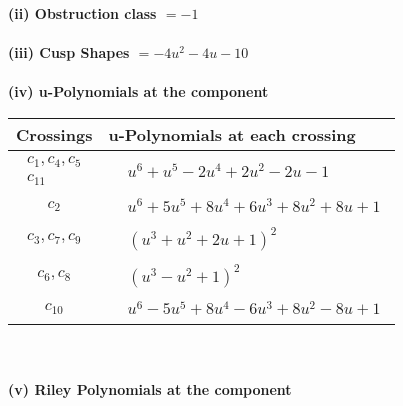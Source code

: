 \documentclass[1p]{elsarticle_modified}
\theoremstyle{definition}
\begin{document}
\flushleft \textbf{(ii) Obstruction class $= -1$}\\~\\
\flushleft \textbf{(iii) Cusp Shapes $= -4 u^2-4 u-10$}\\~\\
\newpage\renewcommand{\arraystretch}{1}
\flushleft \textbf{(iv) u-Polynomials at the component}\newline \\
\begin{tabular}{m{50pt}|m{274pt}}
Crossings & \hspace{64pt}u-Polynomials at each crossing \\
\hline $$\begin{aligned}c_{1},c_{4},c_{5}\\c_{11}\end{aligned}$$&$\begin{aligned}
&u^6+u^5-2 u^4+2 u^2-2 u-1
\end{aligned}$\\
\hline $$\begin{aligned}c_{2}\end{aligned}$$&$\begin{aligned}
&u^6+5 u^5+8 u^4+6 u^3+8 u^2+8 u+1
\end{aligned}$\\
\hline $$\begin{aligned}c_{3},c_{7},c_{9}\end{aligned}$$&$\begin{aligned}
&(u^3+u^2+2 u+1)^2
\end{aligned}$\\
\hline $$\begin{aligned}c_{6},c_{8}\end{aligned}$$&$\begin{aligned}
&(u^3- u^2+1)^2
\end{aligned}$\\
\hline $$\begin{aligned}c_{10}\end{aligned}$$&$\begin{aligned}
&u^6-5 u^5+8 u^4-6 u^3+8 u^2-8 u+1
\end{aligned}$\\
\hline
\end{tabular}\\~\\
\newpage\renewcommand{\arraystretch}{1}
\flushleft \textbf{(v) Riley Polynomials at the component}\newline \\
\end{document}
